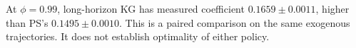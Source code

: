 At $\phi=0.99$, long-horizon KG has measured coefficient $0.1659\pm0.0011$, higher than PS's $0.1495\pm0.0010$. This is a paired comparison on the same exogenous trajectories. It does not establish optimality of either policy.
